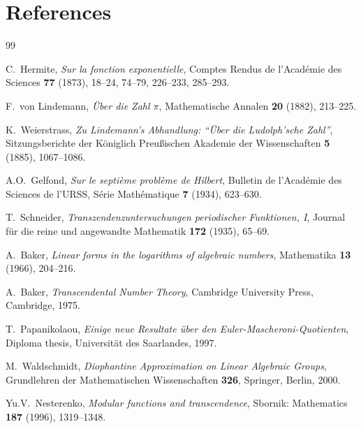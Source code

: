 \documentclass[12pt,a4paper]{amsart}
\theoremstyle{definition}
\begin{document}
\section{References}

\begin{thebibliography}{99}

C.~Hermite,
\textit{Sur la fonction exponentielle},
Comptes Rendus de l'Acad\'emie des Sciences \textbf{77} (1873), 18--24, 74--79, 226--233, 285--293.

F.~von Lindemann,
\textit{\"Uber die Zahl $\pi$},
Mathematische Annalen \textbf{20} (1882), 213--225.

K.~Weierstrass,
\textit{Zu Lindemann's Abhandlung: ``\"Uber die Ludolph'sche Zahl''},
Sitzungsberichte der K\"oniglich Preu\ss{}ischen Akademie der Wissenschaften
\textbf{5} (1885), 1067--1086.

A.O.~Gelfond,
\textit{Sur le septi\`eme probl\`eme de Hilbert},
Bulletin de l'Acad\'emie des Sciences de l'URSS, S\'erie Math\'ematique
\textbf{7} (1934), 623--630.

T.~Schneider,
\textit{Transzendenzuntersuchungen periodischer Funktionen, I},
Journal f\"ur die reine und angewandte Mathematik \textbf{172} (1935), 65--69.

A.~Baker,
\textit{Linear forms in the logarithms of algebraic numbers},
Mathematika \textbf{13} (1966), 204--216.

A.~Baker,
\textit{Transcendental Number Theory},
Cambridge University Press, Cambridge, 1975.

T.~Papanikolaou,
\textit{Einige neue Resultate \"uber den Euler-Mascheroni-Quotienten},
Diploma thesis, Universit\"at des Saarlandes, 1997.

M.~Waldschmidt,
\textit{Diophantine Approximation on Linear Algebraic Groups},
Grundlehren der Mathematischen Wissenschaften \textbf{326},
Springer, Berlin, 2000.

Yu.V.~Nesterenko,
\textit{Modular functions and transcendence},
Sbornik: Mathematics \textbf{187} (1996), 1319--1348.

\end{thebibliography}
\end{document}
